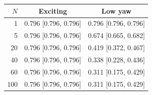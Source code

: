 \begin{tabular}{rcc}\toprule
$N$ & Exciting & Low yaw\\\midrule
1 & 0.796 [0.796, 0.796] & 0.796 [0.796, 0.796]\\
5 & 0.796 [0.796, 0.796] & 0.674 [0.665, 0.682]\\
20 & 0.796 [0.796, 0.796] & 0.419 [0.372, 0.467]\\
40 & 0.796 [0.796, 0.796] & 0.338 [0.228, 0.436]\\
60 & 0.796 [0.796, 0.796] & 0.311 [0.175, 0.429]\\
100 & 0.796 [0.796, 0.796] & 0.311 [0.175, 0.429]\\
\bottomrule\end{tabular}
